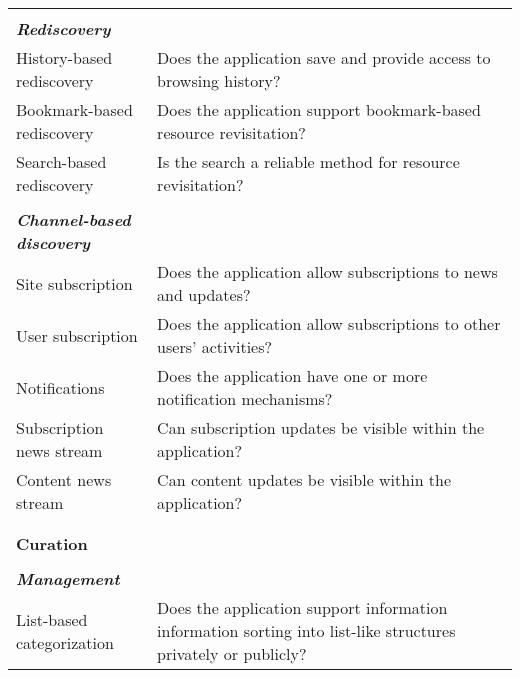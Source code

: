 \documentclass{casconpaper}
\begin{document}
{{\begin{table*}[htbp]
\begin{tabular}{|p{0.28\linewidth}|p{0.72\linewidth}|}
&\\
\emph{\textbf{Rediscovery}}                     &                                                                                                           \\
History-based rediscovery    & Does the application save and provide access to browsing history?                                        \\
Bookmark-based rediscovery   & Does the application support bookmark-based resource revisitation?                                        \\
Search-based rediscovery     & Is the search a reliable method for resource revisitation?                             \\
&\\
\emph{\textbf{Channel-based discovery}}          &                                                                                                           \\
Site subscription            & Does the application allow subscriptions to news and updates?                                             \\
User subscription             & Does the application allow subscriptions to other users' activities?                                      \\
Notifications                & Does the application have one or more notification mechanisms?                                                      \\
Subscription news stream                  & Can subscription updates be visible within the application?  \\
Content news stream                  & Can content updates be visible within the application? \\
&\\
\hline     
&\\                                        
\textbf{\large{Curation}}                     &                                                                                                        \\     
&\\  
\emph{\textbf{Management}}                    &                                                                                                           \\
List-based categorization               & Does the application support information information sorting into list-like structures privately or publicly?                                                  \\

\end{tabular}
\end{table*}}}
\end{document}
